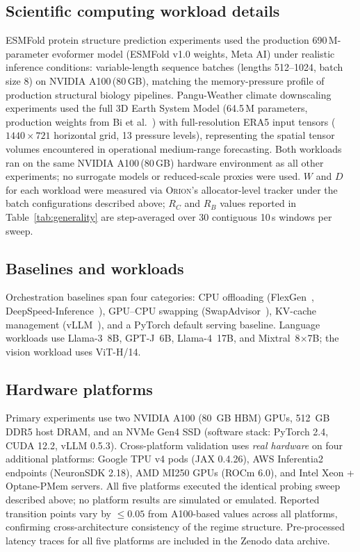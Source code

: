 \subsection*{Scientific computing workload details}

ESMFold protein structure prediction experiments used the production
690\,M-parameter evoformer model (ESMFold v1.0 weights, Meta AI)
under realistic inference conditions: variable-length sequence batches
(lengths 512--1024, batch size 8) on NVIDIA A100\,(80\,GB), matching
the memory-pressure profile of production structural biology pipelines.
Pangu-Weather climate downscaling experiments used the full 3D Earth
System Model (64.5\,M parameters, production weights from Bi
et al.~\cite{bi2023pangu}) with full-resolution ERA5 input tensors
($1440 \times 721$ horizontal grid, 13 pressure levels), representing
the spatial tensor volumes encountered in operational medium-range
forecasting.
Both workloads ran on the same NVIDIA A100\,(80\,GB) hardware environment
as all other experiments; no surrogate models or reduced-scale proxies
were used.
$W$ and $D$ for each workload were measured via \textsc{Orion}'s
allocator-level tracker under the batch configurations described above;
$R_C$ and $R_B$ values reported in Table~\ref{tab:generality} are
step-averaged over 30 contiguous 10\,s windows per sweep.

\subsection*{Baselines and workloads}

Orchestration baselines span four categories: CPU offloading
(FlexGen~\cite{flexgen2023}, DeepSpeed-Inference~\cite{aminabadi2022deepspeedinference}),
GPU--CPU swapping (SwapAdvisor~\cite{huang2020swapadvisor}),
KV-cache management (vLLM~\cite{kwon2023pagedattention}),
and a PyTorch default serving baseline.
Language workloads use Llama-3~8B, GPT-J~6B, Llama-4~17B, and
Mixtral~8$\times$7B; the vision workload uses ViT-H/14.

\subsection*{Hardware platforms}

Primary experiments use two NVIDIA A100 (80~GB HBM) GPUs, 512~GB DDR5 host
DRAM, and an NVMe Gen4 SSD (software stack: PyTorch 2.4, CUDA 12.2, vLLM 0.5.3).
Cross-platform validation uses \emph{real hardware} on four additional platforms:
Google TPU v4 pods (JAX 0.4.26), AWS Inferentia2 endpoints (NeuronSDK 2.18),
AMD MI250 GPUs (ROCm 6.0), and Intel Xeon + Optane-PMem servers.
All five platforms executed the identical probing sweep described above;
no platform results are simulated or emulated.
Reported transition points vary by $\leq 0.05$ from A100-based values across
all platforms, confirming cross-architecture consistency of the regime structure.
Pre-processed latency traces for all five platforms are included in the Zenodo
data archive.


